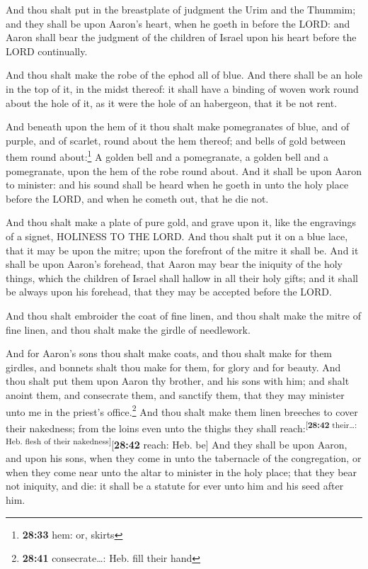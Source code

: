  And thou shalt put in the breastplate of judgment the
Urim and the Thummim; and they shall be upon Aaron's heart, when he
goeth in before the LORD: and Aaron shall bear the judgment of the
children of Israel upon his heart before the LORD continually.

 And thou shalt make the robe of the ephod all of blue.
 And there shall be an hole in the top of it, in the
midst thereof: it shall have a binding of woven work round about the
hole of it, as it were the hole of an habergeon, that it be not rent.

 And beneath upon the hem of it thou shalt make
pomegranates of blue, and of purple, and of scarlet, round about the hem
thereof; and bells of gold between them round about:\footnote{\textbf{28:33}
  hem: or, skirts}  A golden bell and a pomegranate, a
golden bell and a pomegranate, upon the hem of the robe round about.
 And it shall be upon Aaron to minister: and his sound
shall be heard when he goeth in unto the holy place before the LORD, and
when he cometh out, that he die not.

 And thou shalt make a plate of pure gold, and grave upon
it, like the engravings of a signet, HOLINESS TO THE LORD.
 And thou shalt put it on a blue lace, that it may be
upon the mitre; upon the forefront of the mitre it shall be.
 And it shall be upon Aaron's forehead, that Aaron may
bear the iniquity of the holy things, which the children of Israel shall
hallow in all their holy gifts; and it shall be always upon his
forehead, that they may be accepted before the LORD.

 And thou shalt embroider the coat of fine linen, and
thou shalt make the mitre of fine linen, and thou shalt make the girdle
of needlework.

 And for Aaron's sons thou shalt make coats, and thou
shalt make for them girdles, and bonnets shalt thou make for them, for
glory and for beauty.  And thou shalt put them upon Aaron
thy brother, and his sons with him; and shalt anoint them, and
consecrate them, and sanctify them, that they may minister unto me in
the priest's office.\footnote{\textbf{28:41} consecrate\ldots: Heb. fill
  their hand}  And thou shalt make them linen breeches to
cover their nakedness; from the loins even unto the thighs they shall
reach:\textsuperscript{{[}\textbf{28:42} their\ldots: Heb. flesh of
their nakedness{]}}{[}\textbf{28:42} reach: Heb. be{]} 
And they shall be upon Aaron, and upon his sons, when they come in unto
the tabernacle of the congregation, or when they come near unto the
altar to minister in the holy place; that they bear not iniquity, and
die: it shall be a statute for ever unto him and his seed after him.

